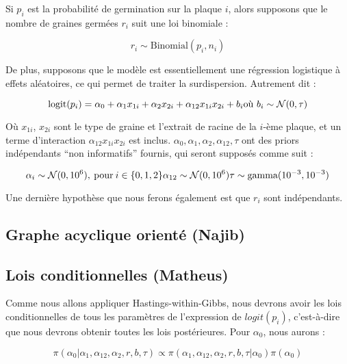 \documentclass[
]{article}
\begin{document}
Si \(p_i\) est la probabilité de germination sur la plaque \(i\), alors
supposons que le nombre de graines germées \(r_i\) suit une loi
binomiale :

\[
r_i \sim \text{Binomial}(p_i,n_i)
\]

De plus, supposons que le modèle est essentiellement une régression
logistique à effets aléatoires, ce qui permet de traiter la
surdispersion. Autrement dit :

\[
  \text{logit}(p_i) = \alpha_0 + \alpha_1x_{1i} + \alpha_2x_{2i} + \alpha_{12}x_{1i}x_{2i} + b_i \\
  \text{où } b_i \sim \mathcal{N}(0,\tau)
\]

Où \(x_{1i}\), \(x_{2i}\) sont le type de graine et l'extrait de racine
de la \(i\)-ème plaque, et un terme d'interaction
\(\alpha_{12}x_{1i}x_{2i}\) est inclus.
\(\alpha_0, \alpha_1, \alpha_2, \alpha_{12}, \tau\) ont des priors
indépendants ``non informatifs'' fournis, qui seront supposés comme suit
:

\[
  \alpha_i \sim \mathcal{N}(0, 10^6), \: \text{pour} \: i \in \{0, 1, 2\} \\
  \alpha_{12} \sim \mathcal{N}(0, 10^6) \\
  \tau \sim \text{gamma}(10^{-3}, 10^{-3})
\]

Une dernière hypothèse que nous ferons également est que \(r_i\) sont
indépendants.

\hypertarget{graphe-acyclique-orientuxe9-najib}{%
\subsection{Graphe acyclique orienté
(Najib)}\label{graphe-acyclique-orientuxe9-najib}}

\hypertarget{lois-conditionnelles-matheus}{%
\subsection{Lois conditionnelles
(Matheus)}\label{lois-conditionnelles-matheus}}

Comme nous allons appliquer Hastings-within-Gibbs, nous devrons avoir
les lois conditionnelles de tous les paramètres de l'expression de
\(logit(p_i)\), c'est-à-dire que nous devrons obtenir toutes les lois
postérieures. Pour \(\alpha_0\), nous aurons :

\[
  \pi(\alpha_0|\alpha_1, \alpha_{12}, \alpha_2, r, b, \tau) \propto \pi(\alpha_1, \alpha_{12}, \alpha_2, r, b, \tau|\alpha_0)\pi(\alpha_0)
\]
\end{document}
